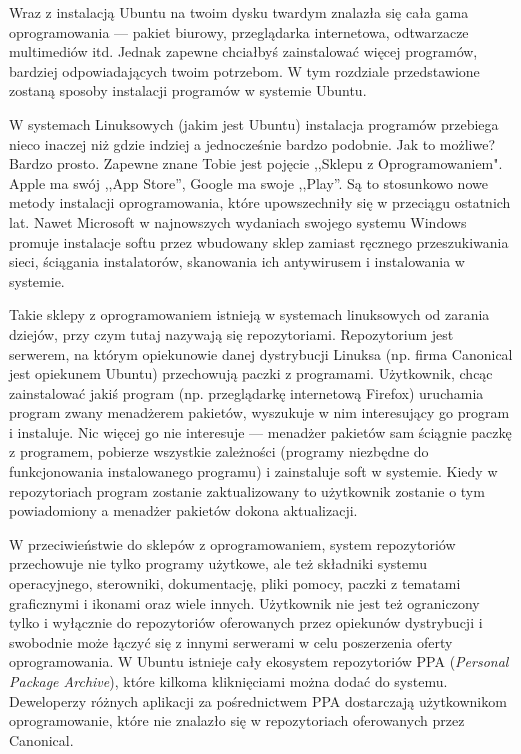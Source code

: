 Wraz z instalacją Ubuntu na twoim dysku twardym znalazła się cała gama oprogramowania --- pakiet biurowy, przeglądarka internetowa, odtwarzacze multimediów itd. Jednak zapewne chciałbyś zainstalować więcej programów, bardziej odpowiadających twoim potrzebom. W tym rozdziale przedstawione zostaną sposoby instalacji programów w systemie Ubuntu.

W systemach Linuksowych (jakim jest Ubuntu) instalacja programów przebiega nieco inaczej niż gdzie indziej a jednocześnie bardzo podobnie. Jak to możliwe? Bardzo prosto. Zapewne znane Tobie jest pojęcie ,,Sklepu z Oprogramowaniem". Apple ma swój ,,App Store'', Google ma swoje ,,Play''. Są to stosunkowo nowe metody instalacji oprogramowania, które upowszechniły się w przeciągu ostatnich lat. Nawet Microsoft w najnowszych wydaniach swojego systemu Windows promuje instalacje softu przez wbudowany sklep zamiast ręcznego przeszukiwania sieci, ściągania instalatorów, skanowania ich antywirusem i instalowania w systemie.

Takie sklepy z oprogramowaniem istnieją w systemach linuksowych od zarania dziejów, przy czym tutaj nazywają się \textcolor{ubuntu_orange}{repozytoriami}. Repozytorium jest serwerem, na którym opiekunowie danej dystrybucji Linuksa (np. firma Canonical jest opiekunem Ubuntu) przechowują paczki z programami. Użytkownik, chcąc zainstalować jakiś program (np. przeglądarkę internetową Firefox) uruchamia program zwany \textcolor{ubuntu_orange}{menadżerem pakietów}, wyszukuje w nim interesujący go program i instaluje. Nic więcej go nie interesuje --- menadżer pakietów sam ściągnie paczkę z programem, pobierze wszystkie zależności (programy niezbędne do funkcjonowania instalowanego programu) i zainstaluje soft w systemie. Kiedy w repozytoriach program zostanie zaktualizowany to użytkownik zostanie o tym powiadomiony a menadżer pakietów dokona aktualizacji.

W przeciwieństwie do sklepów z oprogramowaniem, system repozytoriów przechowuje nie tylko programy użytkowe, ale też składniki systemu operacyjnego, sterowniki, dokumentację, pliki pomocy, paczki z tematami graficznymi i ikonami oraz wiele innych. Użytkownik nie jest też ograniczony tylko i wyłącznie do repozytoriów oferowanych przez opiekunów dystrybucji i swobodnie może łączyć się z innymi serwerami w celu poszerzenia oferty oprogramowania. W Ubuntu istnieje cały ekosystem repozytoriów PPA (\textit{Personal Package Archive}), które kilkoma kliknięciami można dodać do systemu. Deweloperzy różnych aplikacji za pośrednictwem PPA dostarczają użytkownikom oprogramowanie, które nie znalazło się w repozytoriach oferowanych przez Canonical.

